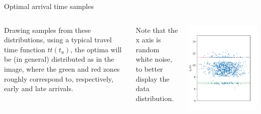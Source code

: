 \documentclass{beamer}
\begin{document}
\begin{frame}{Optimal arrival time samples}
  
  \begin{columns}
      Drawing samples from these distributions, using a typical travel time function \(tt(t_a)\), the optima will be (in general) distributed as in the image,
      where the green and red zones roughly correspond to, respectively, early and late arrivals.

      Note that the x axis is random white noise, to better display the data distribution.
      
    \centering
      \includegraphics[width=\textwidth]{t_as}
  \end{columns}
\end{frame}
\end{document}
